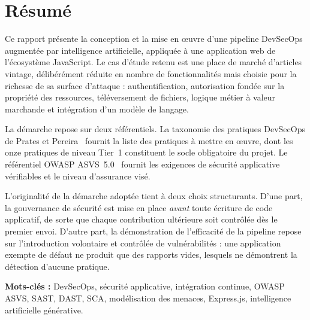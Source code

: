 \documentclass[11pt,a4paper,oneside]{report}
\begin{document}
\chapter*{Résumé}

Ce rapport présente la conception et la mise en œuvre d'une pipeline DevSecOps
augmentée par intelligence artificielle, appliquée à une application web de
l'écosystème JavaScript. Le cas d'étude retenu est une place de marché
d'articles vintage, délibérément réduite en nombre de fonctionnalités mais
choisie pour la richesse de sa surface d'attaque : authentification,
autorisation fondée sur la propriété des ressources, téléversement de fichiers,
logique métier à valeur marchande et intégration d'un modèle de langage.

La démarche repose sur deux référentiels. La taxonomie des pratiques DevSecOps
de Prates et Pereira~\cite{prates2025} fournit la liste des pratiques à mettre
en œuvre, dont les onze pratiques de niveau Tier~1 constituent le socle
obligatoire du projet. Le référentiel OWASP ASVS~5.0~\cite{owaspasvs5} fournit
les exigences de sécurité applicative vérifiables et le niveau d'assurance visé.

L'originalité de la démarche adoptée tient à deux choix structurants. D'une
part, la gouvernance de sécurité est mise en place \emph{avant} toute écriture
de code applicatif, de sorte que chaque contribution ultérieure soit contrôlée
dès le premier envoi. D'autre part, la démonstration de l'efficacité de la
pipeline repose sur l'introduction volontaire et contrôlée de vulnérabilités :
une application exempte de défaut ne produit que des rapports vides, lesquels
ne démontrent la détection d'aucune pratique.

\vspace{0.6cm}
\noindent\textbf{Mots-clés :} DevSecOps, sécurité applicative, intégration
continue, OWASP ASVS, SAST, DAST, SCA, modélisation des menaces,
Express.js, intelligence artificielle générative.

\tableofcontents
\listoffigures
\listoftables

\end{document}
